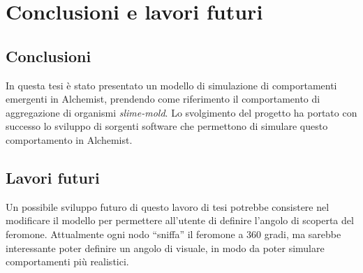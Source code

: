 \chapter{Conclusioni e lavori futuri}
\section{Conclusioni}
In questa tesi è stato presentato un modello di simulazione di comportamenti emergenti in Alchemist,
prendendo come riferimento il comportamento di aggregazione di organismi \textit{slime-mold}.
Lo svolgimento del progetto ha portato con successo lo sviluppo di sorgenti software che permettono di simulare
questo comportamento in Alchemist.
\section{Lavori futuri}
Un possibile sviluppo futuro di questo lavoro di tesi potrebbe consistere nel modificare il modello per permettere all'utente di definire l'angolo di 
scoperta del feromone. Attualmente ogni nodo ``sniffa'' il feromone a 360 gradi, ma sarebbe interessante
poter definire un angolo di visuale, in modo da poter simulare comportamenti più realistici.